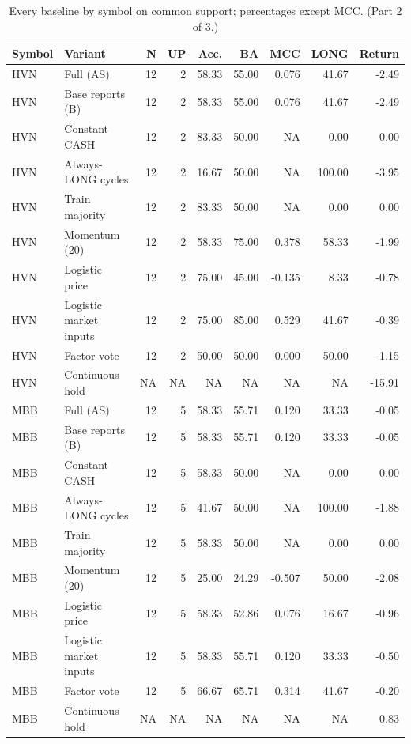 \begin{table}[htbp]
\centering\small
\caption{Every baseline by symbol on common support; percentages except MCC. (Part 2 of 3.)}
\label{tab:r1_common_symbols_2}
\setlength{\tabcolsep}{3.5pt}
\begin{tabular}{llrrrrrrr}
\hline
Symbol & Variant & N & UP & Acc. & BA & MCC & LONG & Return \\
\hline
HVN & Full (AS) & 12 & 2 & 58.33 & 55.00 & 0.076 & 41.67 & -2.49 \\
HVN & Base reports (B) & 12 & 2 & 58.33 & 55.00 & 0.076 & 41.67 & -2.49 \\
HVN & Constant CASH & 12 & 2 & 83.33 & 50.00 & NA & 0.00 & 0.00 \\
HVN & Always-LONG cycles & 12 & 2 & 16.67 & 50.00 & NA & 100.00 & -3.95 \\
HVN & Train majority & 12 & 2 & 83.33 & 50.00 & NA & 0.00 & 0.00 \\
HVN & Momentum (20) & 12 & 2 & 58.33 & 75.00 & 0.378 & 58.33 & -1.99 \\
HVN & Logistic price & 12 & 2 & 75.00 & 45.00 & -0.135 & 8.33 & -0.78 \\
HVN & Logistic market inputs & 12 & 2 & 75.00 & 85.00 & 0.529 & 41.67 & -0.39 \\
HVN & Factor vote & 12 & 2 & 50.00 & 50.00 & 0.000 & 50.00 & -1.15 \\
HVN & Continuous hold & NA & NA & NA & NA & NA & NA & -15.91 \\
MBB & Full (AS) & 12 & 5 & 58.33 & 55.71 & 0.120 & 33.33 & -0.05 \\
MBB & Base reports (B) & 12 & 5 & 58.33 & 55.71 & 0.120 & 33.33 & -0.05 \\
MBB & Constant CASH & 12 & 5 & 58.33 & 50.00 & NA & 0.00 & 0.00 \\
MBB & Always-LONG cycles & 12 & 5 & 41.67 & 50.00 & NA & 100.00 & -1.88 \\
MBB & Train majority & 12 & 5 & 58.33 & 50.00 & NA & 0.00 & 0.00 \\
MBB & Momentum (20) & 12 & 5 & 25.00 & 24.29 & -0.507 & 50.00 & -2.08 \\
MBB & Logistic price & 12 & 5 & 58.33 & 52.86 & 0.076 & 16.67 & -0.96 \\
MBB & Logistic market inputs & 12 & 5 & 58.33 & 55.71 & 0.120 & 33.33 & -0.50 \\
MBB & Factor vote & 12 & 5 & 66.67 & 65.71 & 0.314 & 41.67 & -0.20 \\
MBB & Continuous hold & NA & NA & NA & NA & NA & NA & 0.83 \\

\end{tabular}
\end{table}
